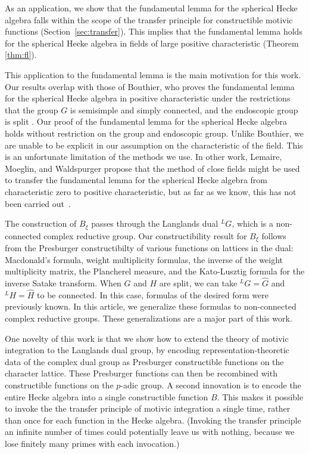 As an application, we show that the fundamental lemma for the
spherical Hecke algebra falls within the scope of the transfer
principle for constructible motivic functions (Section~\ref{sec:transfer}).  This implies that the
fundamental lemma holds for the spherical Hecke algebra in fields of
large positive characteristic (Theorem \ref{thm:fl}).

This application to the fundamental lemma is the main motivation for
this work.  Our results overlap with those of Bouthier, who proves the
fundamental lemma for the spherical Hecke algebra in positive
characteristic under the restrictions that the group $G$ is semisimple
and simply connected, and the endoscopic group is split
\cite[Theorem~0.2]{bouthier}.  Our proof of the fundamental lemma for
the spherical Hecke algebra holds without restriction on the
group and endoscopic group.  Unlike Bouthier, we are unable to be
explicit in our assumption on the characteristic of the field.  This
is an unfortunate limitation of the methods we use.  In other work,
Lemaire, Moeglin, and Waldspurger propose that the method of close
fields might be used to transfer the fundamental lemma for the
spherical Hecke algebra from characteristic zero to positive
characteristic, but as far as we know, this has not been carried
out~\cite[\S1.3]{LMW}.

The construction of $B_\xi$ passes through the Langlands dual ${}^LG$, which
is a non-connected complex reductive group.  Our constructibility
result for $B_\xi$ follows from the Presburger constructibilty of
various functions on lattices in the dual: Macdonald's formula, weight
multiplicity formulas, the inverse of the weight multiplicity matrix,
the Plancherel measure, and the Kato-Lusztig formula for the inverse
Satake transform.  When $G$ and $H$ are split, we can take ${}^LG =
\hat G$ and ${}^LH=\hat H$ to be connected.  In this case, formulas of
the desired form were previously known.  In this article, we
generalize these formulas to non-connected complex reductive groups.
These generalizations are a major part of this work.

One novelty of this work is that we show how to extend the theory of
motivic integration to the Langlands dual group, by encoding
representation-theoretic data of the complex dual group as Presburger
constructible functions on the character lattice. These Presburger
functions can then be recombined with constructible functions on the
$p$-adic group.  A second innovation is to encode the entire Hecke
algebra into a single constructible function $B$.  This makes it
possible to invoke the the transfer principle of motivic integration a
single time, rather than once for each function in the Hecke algebra.
(Invoking the transfer principle an infinite number of times could
potentially leave us with nothing, because we lose finitely many
primes with each invocation.)

